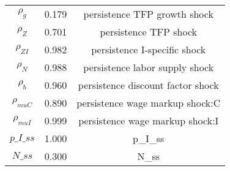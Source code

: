 \begin{center}
\begin{longtable}{ccc}
${\rho_g}$ 	 & 	 0.179 	 & 	 persistence TFP growth shock\\
${\rho_Z}$ 	 & 	 0.701 	 & 	 persistence TFP shock\\
${\rho_{ZI}}$ 	 & 	 0.982 	 & 	 persistence I-specific shock\\
${\rho_N}$ 	 & 	 0.988 	 & 	 persistence labor supply shock\\
${\rho_b}$ 	 & 	 0.960 	 & 	 persistence discount factor shock\\
${\rho_{muC}}$ 	 & 	 0.890 	 & 	 persistence wage markup shock:C\\
${\rho_{muI}}$ 	 & 	 0.999 	 & 	 persistence wage markup shock:I\\
$p\_I\_ss$ 	 & 	 1.000 	 & 	 p\_I\_ss\\
$N\_ss$ 	 & 	 0.300 	 & 	 N\_ss\\
\bottomrule%
\end{longtable}
\end{center}
